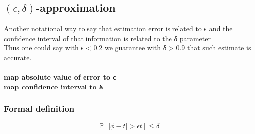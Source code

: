 \subsection{$(\epsilon, \delta)$-approximation}

Another notational way to say that estimation error is related to ϵ and the confidence interval of that information is related to the δ parameter
\\
Thus one could say with ϵ < 0.2 we guarantee with δ > 0.9 that such estimate is accurate.
\\\\
\textbf{map absolute value of error to ϵ}
\\
\textbf{map confidence interval to δ}

\subsubsection{Formal definition}

\begin{equation}
	\mathds{P}[|\phi - t| > ϵt] \le \delta
	\label{eq:eps-delta approximtion}
\end{equation}

